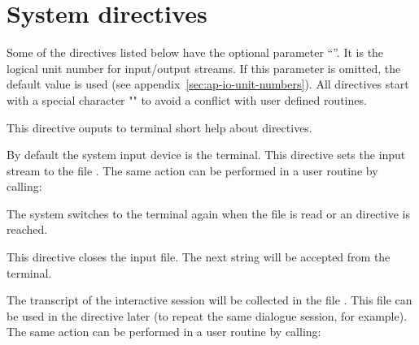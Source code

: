 
\chapter{System directives}
\label{sec:system-directives}
 
Some of the directives listed below have the optional
parameter ``''. It is the logical unit number for input/output
streams. If this parameter is omitted, the default value
is used (see appendix~\ref{sec:ap-io-unit-numbers}).
All \COMIS{} directives start with a special character "\excl{}" to avoid
a conflict with user defined routines.
 
  
This directive ouputs to terminal short help about directives.
 
 
By default the system input device is the terminal. 
This directive sets the input stream to the file .
The same action can be performed in a user routine by calling:

 
The system switches to the terminal again when the file
is read or an  directive is reached.
 
 
This directive closes the input file.
The next string will be accepted from the terminal.
 
 
The transcript of the interactive session will be collected in the file
. This file can be used in the  directive
later (to repeat the same dialogue session, for example).
The same action can be performed in a user routine by calling:

